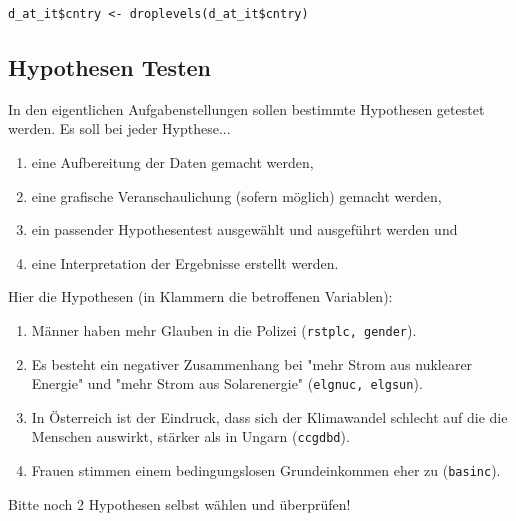 \documentclass{article}
\begin{document}
 \begin{lstlisting}
d_at_it$cntry <- droplevels(d_at_it$cntry) 
\end{lstlisting}


\subsection{Hypothesen Testen}

In den eigentlichen Aufgabenstellungen sollen bestimmte Hypothesen getestet werden. Es soll bei jeder Hypthese...
\begin{enumerate}
	\item eine Aufbereitung der Daten gemacht werden,
	\item eine grafische Veranschaulichung (sofern möglich) gemacht werden,
	\item ein passender Hypothesentest ausgewählt und ausgeführt werden und
	\item eine Interpretation der Ergebnisse erstellt werden.
\end{enumerate}


Hier die Hypothesen (in Klammern die betroffenen Variablen):


\begin{enumerate}
	\item Männer haben mehr Glauben in die Polizei (\texttt{rstplc, gender}).
	\item Es besteht ein negativer Zusammenhang bei "mehr Strom aus nuklearer Energie" und "mehr Strom aus Solarenergie" (\texttt{elgnuc, elgsun}).
	\item In Österreich ist der Eindruck, dass sich der Klimawandel schlecht auf die die Menschen auswirkt, stärker als in Ungarn (\texttt{ccgdbd}). 
	\item Frauen stimmen einem bedingungslosen Grundeinkommen eher zu (\texttt{basinc}).
\end{enumerate}

Bitte noch 2 Hypothesen selbst wählen und überprüfen!
\end{document}
